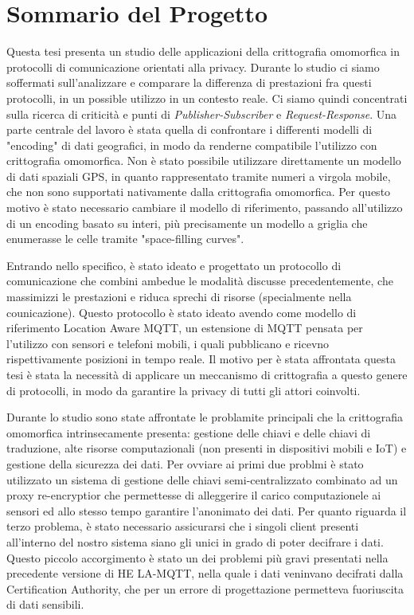 \documentclass[12pt,a4paper,twoside]{book}
\begin{document}
\chapter{Sommario del Progetto}

Questa tesi presenta un studio delle applicazioni della crittografia omomorfica in protocolli di comunicazione orientati alla privacy. Durante lo studio ci siamo soffermati sull'analizzare e comparare la differenza di prestazioni fra questi protocolli, in un possible utilizzo in un contesto reale. Ci siamo quindi concentrati sulla ricerca di criticità e punti di \textit{Publisher-Subscriber} e \textit{Request-Response}.
Una parte centrale del lavoro è stata quella di confrontare i differenti modelli di "encoding" di dati geografici, in modo da renderne compatibile l'utilizzo con crittografia omomorfica. Non è stato possibile utilizzare direttamente un modello di dati spaziali GPS, in quanto rappresentato tramite numeri a virgola mobile, che non sono supportati nativamente dalla crittografia omomorfica. Per questo motivo è stato necessario cambiare il modello di riferimento, passando all'utilizzo di un encoding basato su interi, più precisamente un modello a griglia che enumerasse le celle tramite "space-filling curves".

Entrando nello specifico, è stato ideato e progettato un protocollo di comunicazione che combini ambedue le modalità discusse precedentemente, che massimizzi le prestazioni e riduca sprechi di risorse (specialmente nella counicazione). Questo protocollo è stato ideato avendo come modello di riferimento Location Aware MQTT, un estensione di MQTT pensata per l'utilizzo con sensori e telefoni mobili, i quali pubblicano e ricevno rispettivamente posizioni in tempo reale. Il motivo per è stata affrontata questa tesi è stata la necessità di applicare un meccanismo di crittografia a questo genere di protocolli, in modo da garantire la privacy di tutti gli attori coinvolti.

Durante lo studio sono state affrontate le problamite principali che la crittografia omomorfica intrinsecamente presenta: gestione delle chiavi e delle chiavi di traduzione, alte risorse computazionali (non presenti in dispositivi mobili e IoT) e gestione della sicurezza dei dati. Per ovviare ai primi due problmi è stato utilizzato un sistema di gestione delle chiavi semi-centralizzato combinato ad un proxy re-encryptior che permettesse di alleggerire il carico computazionele ai sensori ed allo stesso tempo garantire l'anonimato dei dati. Per quanto riguarda il terzo problema, è stato necessario assicurarsi che i singoli client presenti all'interno del nostro sistema siano gli unici in grado di poter decifrare i dati. Questo piccolo accorgimento è stato un dei problemi più gravi presentati nella precedente versione di HE LA-MQTT, nella quale i dati veninvano decifrati dalla Certification Authority, che per un errore di progettazione permetteva fuoriuscita di dati sensibili.
\end{document}

